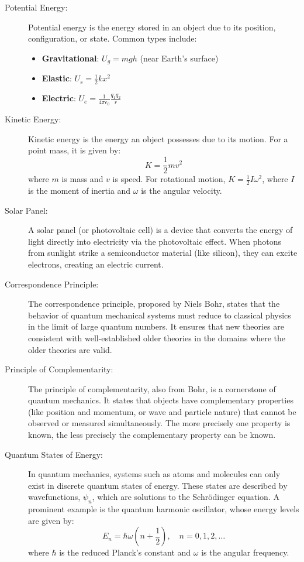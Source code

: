 \documentclass[12pt]{article}
\begin{document}
\begin{description}
\item[Potential Energy:]
Potential energy is the energy stored in an object due to its position, configuration, or state. Common types include:
\begin{itemize}
    \item \textbf{Gravitational}: \( U_g = mgh \) (near Earth's surface)
    \item \textbf{Elastic}: \( U_s = \frac{1}{2}kx^2 \)
    \item \textbf{Electric}: \( U_e = \frac{1}{4\pi\epsilon_0} \frac{q_1 q_2}{r} \)
\end{itemize}

\item[Kinetic Energy:]
Kinetic energy is the energy an object possesses due to its motion. For a point mass, it is given by:
\[
K = \frac{1}{2}mv^2
\]
where \( m \) is mass and \( v \) is speed. For rotational motion, \( K = \frac{1}{2}I\omega^2 \), where \( I \) is the moment of inertia and \( \omega \) is the angular velocity.

\item[Solar Panel:]
A solar panel (or photovoltaic cell) is a device that converts the energy of light directly into electricity via the photovoltaic effect. When photons from sunlight strike a semiconductor material (like silicon), they can excite electrons, creating an electric current.

\item[Correspondence Principle:]
The correspondence principle, proposed by Niels Bohr, states that the behavior of quantum mechanical systems must reduce to classical physics in the limit of large quantum numbers. It ensures that new theories are consistent with well-established older theories in the domains where the older theories are valid.

\item[Principle of Complementarity:]
The principle of complementarity, also from Bohr, is a cornerstone of quantum mechanics. It states that objects have complementary properties (like position and momentum, or wave and particle nature) that cannot be observed or measured simultaneously. The more precisely one property is known, the less precisely the complementary property can be known.

\item[Quantum States of Energy:]
In quantum mechanics, systems such as atoms and molecules can only exist in discrete quantum states of energy. These states are described by wavefunctions, \( \psi_n \), which are solutions to the Schr\"{o}dinger equation. A prominent example is the quantum harmonic oscillator, whose energy levels are given by:
\[
E_n = \hbar \omega \left( n + \frac{1}{2} \right), \quad n = 0, 1, 2, \dots
\]
where \( \hbar \) is the reduced Planck's constant and \( \omega \) is the angular frequency.
\end{description}
\end{document}
